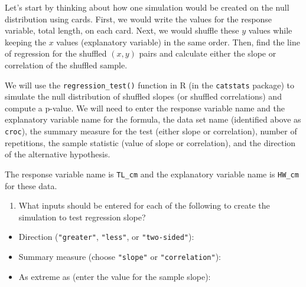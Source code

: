\documentclass[
]{report}
\providecommand{\tightlist}{%
  \setlength{\itemsep}{0pt}\setlength{\parskip}{0pt}}
\begin{document}
Let's start by thinking about how one simulation would be created on the null distribution using cards. First, we would write the values for the response variable, total length, on each card. Next, we would shuffle these \(y\) values while keeping the \(x\) values (explanatory variable) in the same order. Then, find the line of regression for the shuffled \((x, y)\) pairs and calculate either the slope or correlation of the shuffled sample.

We will use the \texttt{regression\_test()} function in R (in the \texttt{catstats} package) to simulate the null distribution of shuffled slopes (or shuffled correlations) and compute a p-value. We will need to enter the response variable name and the explanatory variable name for the formula, the data set name (identified above as \texttt{croc}), the summary measure for the test (either slope or correlation), number of repetitions, the sample statistic (value of slope or correlation), and the direction of the alternative hypothesis.

The response variable name is \texttt{TL\_cm} and the explanatory variable name is \texttt{HW\_cm} for these data.

\begin{enumerate}
\def\labelenumi{\arabic{enumi}.}
\setcounter{enumi}{7}
\tightlist
\item
  What inputs should be entered for each of the following to create the simulation to test regression slope?
\end{enumerate}

\vspace{.5 mm}

\begin{itemize}
\tightlist
\item
  Direction (\texttt{"greater"}, \texttt{"less"}, or \texttt{"two-sided"}):
\end{itemize}

\vspace{.2in}

\begin{itemize}
\tightlist
\item
  Summary measure (choose \texttt{"slope"} or \texttt{"correlation"}):
\end{itemize}

\vspace{.2in}

\begin{itemize}
\tightlist
\item
  As extreme as (enter the value for the sample slope):
\end{itemize}
\end{document}
